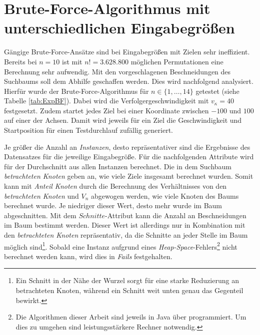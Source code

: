 \documentclass[german,version-2019-11]{uzl-thesis}
\begin{document}
\section{Brute-Force-Algorithmus mit unterschiedlichen Eingabegrößen}
\label{kap5:bf}

Gängige Brute-Force-Ansätze sind bei Eingabegrößen mit Zielen sehr ineffizient. Bereits bei $n=10$ ist mit $n!=3.628.800$ möglichen Permutationen eine Berechnung sehr aufwendig. Mit den vorgeschlagenen Beschneidungen des Suchbaums soll dem Abhilfe geschaffen werden. Dies wird nachfolgend analysiert. Hierfür wurde der Brute-Force-Algorithmus für $n\in\{1,\dots,14\}$ getestet (siehe Tabelle \ref{tab:ExpBF}). Dabei wird die Verfolgergeschwindigkeit mit $v_{\kappa}=40$ festgesetzt. Zudem startet jedes Ziel bei einer Koordinate zwischen $-100$ und $100$ auf einer der Achsen. Damit wird jeweils für ein Ziel die Geschwindigkeit und Startposition für einen Testdurchlauf zufällig generiert.

Je größer die Anzahl an \emph{Instanzen}, desto repräsentativer sind die Ergebnisse des Datensatzes für die jeweilige Eingabegröße. Für die nachfolgenden Attribute wird für der Durchschnitt aus allen Instanzen berechnet. Die in dem Suchbaum \emph{betrachteten Knoten} geben an, wie viele Ziele insgesamt berechnet wurden. Somit kann mit \emph{Anteil Knoten} durch die Berechnung des Verhältnisses von den \emph{betrachteten Knoten} und $V_n$ abgewogen werden, wie viele Knoten des Baums berechnet wurde. Je niedriger dieser Wert, desto mehr wurde im Baum abgeschnitten. Mit dem $Schnitte$-Attribut kann die Anzahl an Beschneidungen im Baum bestimmt werden. Dieser Wert ist allerdings nur in Kombination mit den \emph{betrachteten Knoten} repräsentativ, da die Schnitte an jeder Stelle im Baum möglich sind\footnote{Ein Schnitt in der Nähe der Wurzel sorgt für eine starke Reduzierung an betrachteten Knoten, während ein Schnitt weit unten genau das Gegenteil bewirkt.}. Sobald eine Instanz aufgrund eines \emph{Heap-Space}-Fehlers\footnote{Die Algorithmen dieser Arbeit sind jeweils in Java über programmiert. Um dies zu umgehen sind leistungsstärkere Rechner notwendig.} nicht berechnet werden kann, wird dies in \emph{Fails} festgehalten.
 
\end{document}
